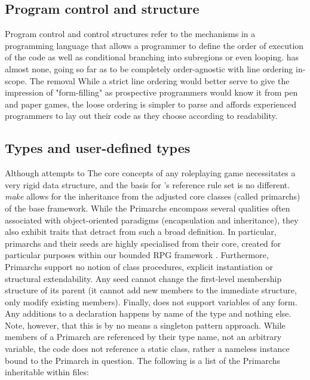 \subsection{Program control and structure}
\label{ref_external_rulebook}
Program control and control structures refer to the mechanisms in a programming language that allows a programmer to define the order of execution of the code as well as conditional branching into subregions or even looping. \langname{} has almost none, going so far as to be completely order-agnostic with line ordering in-scope. 
The removal 
While a strict line ordering would better serve to give the impression of "form-filling" as prospective programmers would know it from pen and paper games, the loose ordering is simpler to parse and affords experienced programmers to lay out their code as they choose according to readability.

\subsection{Types and user-defined types}
Although \langname{} attempts to 
The core concepts of any roleplaying game necessitates a very rigid data structure, and the basis for \langname{} 's reference rule set is no different.
\emph{make} allows for the inheritance from the adjusted core classes (called primarchs) of the base framework. While the Primarchs encompass several qualities often associated with object-oriented paradigms (encapsulation and inheritance), they also exhibit traits that detract from such a broad definition. In particular, primarchs and their seeds  are highly specialised from their core, created for particular purposes within our bounded RPG framework . Furthermore, Primarchs support no notion of class procedures, explicit instantiation or structural extendability. Any seed cannot change the first-level membership structure of its parent (it cannot add new members to the immediate structure, only modify existing members). Finally, \langname{} does not support variables of any form. Any additions to a declaration happens by name of the type and nothing else. Note, however, that this is by no means a singleton pattern approach. While members of a Primarch are referenced by their type name, not an arbitrary variable, the code does not reference a static class, rather a nameless instance bound to the Primarch in question. The following is a list of the Primarchs inheritable within \langname{} files:

